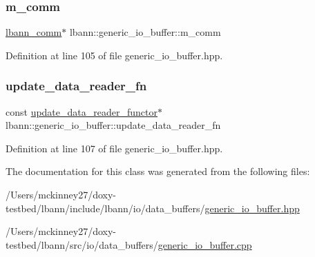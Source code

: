 \subsubsection{\texorpdfstring{m\+\_\+comm}{m\_comm}}
{\footnotesize\ttfamily \hyperlink{classlbann_1_1lbann__comm}{lbann\+\_\+comm}$\ast$ lbann\+::generic\+\_\+io\+\_\+buffer\+::m\+\_\+comm}



Definition at line 105 of file generic\+\_\+io\+\_\+buffer.\+hpp.

\mbox{\label{classlbann_1_1generic__io__buffer_a031eda7559a9e241afb3958b56088560}} 
\subsubsection{\texorpdfstring{update\+\_\+data\+\_\+reader\+\_\+fn}{update\_data\_reader\_fn}}
{\footnotesize\ttfamily const \hyperlink{classlbann_1_1update__data__reader__functor}{update\+\_\+data\+\_\+reader\+\_\+functor}$\ast$ lbann\+::generic\+\_\+io\+\_\+buffer\+::update\+\_\+data\+\_\+reader\+\_\+fn}



Definition at line 107 of file generic\+\_\+io\+\_\+buffer.\+hpp.



The documentation for this class was generated from the following files\+:\begin{DoxyCompactItemize}
\item 
/\+Users/mckinney27/doxy-\/testbed/lbann/include/lbann/io/data\+\_\+buffers/\hyperlink{generic__io__buffer_8hpp}{generic\+\_\+io\+\_\+buffer.\+hpp}\item 
/\+Users/mckinney27/doxy-\/testbed/lbann/src/io/data\+\_\+buffers/\hyperlink{generic__io__buffer_8cpp}{generic\+\_\+io\+\_\+buffer.\+cpp}\end{DoxyCompactItemize}
